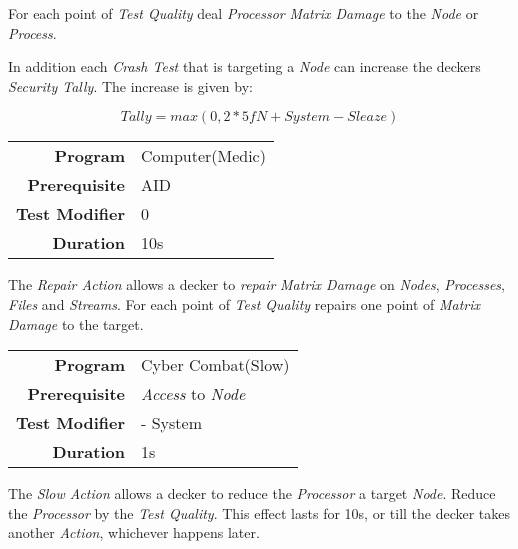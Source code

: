 \hfill

For each point of \emph{Test Quality} deal \emph{Processor} \emph{Matrix Damage}
to the \emph{Node} or \emph{Process}.

In addition each \emph{Crash Test} that is targeting a \emph{Node}
can increase the deckers \emph{Security Tally}.
The increase is given by:

\begin{equation*}
    \textit{Tally} = max(0, 2 * \textit{5fN} + \textit{System} - \textit{Sleaze})
\end{equation*}

\label{par:repair}


\begin{tabular}{rl}
    \textbf{Program}       & Computer(Medic) \\
    \textbf{Prerequisite}  & AID             \\
    \textbf{Test Modifier} & 0               \\
    \textbf{Duration}      & 10s             \\
\end{tabular}

\hfill

The \emph{Repair Action} allows a decker to \emph{repair} \emph{Matrix Damage}
on \emph{Nodes}, \emph{Processes}, \emph{Files} and \emph{Streams}.
For each point of \emph{Test Quality} repairs one point of \emph{Matrix Damage}
to the target.


\label{par:slow node}


\begin{tabular}{rl}
    \textbf{Program}       & Cyber Combat(Slow)           \\
    \textbf{Prerequisite}  & \emph{Access} to \emph{Node} \\
    \textbf{Test Modifier} & - System                     \\
    \textbf{Duration}      & 1s                           \\
\end{tabular}

\hfill

The \emph{Slow Action} allows a decker to reduce the \emph{Processor} a target
\emph{Node}. Reduce the \emph{Processor} by the \emph{Test Quality}. This effect
lasts for 10s, or till the decker takes another \emph{Action}, whichever happens
later.

\label{par:slow process}


